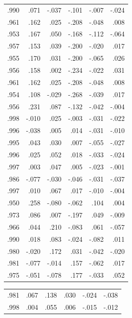 \documentclass{mcmthesis}
\begin{document}
\begin{appendices}
\begin{table}[htbp]
\begin{tabular}{|r|r|r|r|r|r|}
    .990  & .071  & -.037 & -.101 & -.007 & -.024 \\
    .961  & .162  & .025  & -.208 & -.048 & .008 \\
    .953  & .167  & .050  & -.168 & -.112 & -.064 \\
    .957  & .153  & .039  & -.200 & -.020 & .017 \\
    .955  & .170  & .031  & -.200 & -.065 & .026 \\
    .956  & .158  & .002  & -.234 & -.022 & .031 \\
    .961  & .162  & .025  & -.208 & -.048 & .008 \\
    .954  & .108  & -.029 & -.268 & -.039 & .017 \\
    .956  & .231  & .087  & -.132 & -.042 & -.004 \\
    .998  & -.010 & .025  & -.003 & -.031 & -.022 \\
    .996  & -.038 & .005  & .014  & -.031 & -.010 \\
    .995  & .043  & .030  & .007  & -.055 & -.027 \\
    .996  & .025  & .052  & .018  & -.033 & -.024 \\
    .997  & .003  & .047  & .005  & -.023 & -.001 \\
    .986  & -.077 & -.030 & -.046 & -.031 & -.037 \\
    .997  & .010  & .067  & .017  & -.010 & -.004 \\
    .950  & .258  & -.080 & -.062 & .104  & .004 \\
    .973  & .086  & .007  & -.197 & .049  & -.009 \\
    .966  & .044  & .210  & -.083 & .061  & -.057 \\
    .990  & .018  & .083  & -.024 & -.082 & .011 \\
    .980  & -.020 & .172  & .031  & -.042 & -.020 \\
    .981  & -.077 & -.014 & .157  & -.062 & .017 \\
    .975  & -.051 & -.078 & .177  & -.033 & .052 \\
    \end{tabular}%
  \label{tab:addlabel}%
\end{table}%
\begin{table}[htbp]
  \centering
    \begin{tabular}{|r|r|r|r|r|r|}
    .981  & .067  & .138  & .030  & -.024 & -.038 \\
    .998  & .004  & .055  & .006  & -.015 & -.012 \\

\end{tabular}
\end{table}
\end{appendices}
\end{document}
